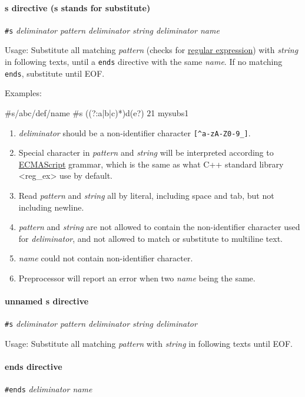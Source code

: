 \documentclass{article}
\begin{document}
\paragraph{s directive (s stands for substitute)} \verb|#s| \textit{deliminator pattern deliminator string deliminator name}

Usage: Substitute all matching \textit{pattern} (checks for \href{https://en.wikipedia.org/wiki/Regular_expression}{regular expression}) with \textit{string} in following texts, until a \verb|ends| directive with the same \textit{name}. If no matching \verb|ends|, substitute until EOF.

Examples:

\begin{MUAvbt}
#s/abc/def/name
#s ((?:a|b|c)*)d(e?) $2$1 mysubs1
\end{MUAvbt}

\begin{enumerate}
	\item \textit{deliminator} should be a non-identifier character \verb|[^a-zA-Z0-9_]|.
	\item Special character in \textit{pattern} and \textit{string} will be interpreted according to \href{https://en.cppreference.com/w/cpp/regex/ecmascript}{ECMAScript} grammar, which is the same as what C++ standard library <reg\_ex> use by default.
	\item Read \textit{pattern} and \textit{string} all by literal, including space and tab, but not including newline.
	\item \textit{pattern} and \textit{string} are not allowed to contain the non-identifier character used for \textit{deliminator}, and not allowed to match or substitute to multiline text.
	\item \textit{name} could not contain non-identifier character.
	\item Preprocessor will report an error when two \textit{name} being the same.
\end{enumerate}

\paragraph{unnamed s directive} \verb|#s| \textit{deliminator pattern deliminator string deliminator}

Usage: Substitute all matching \textit{pattern} with \textit{string} in following texts until EOF.

\paragraph{ends directive} \verb|#ends| \textit{deliminator name}
\end{document}
